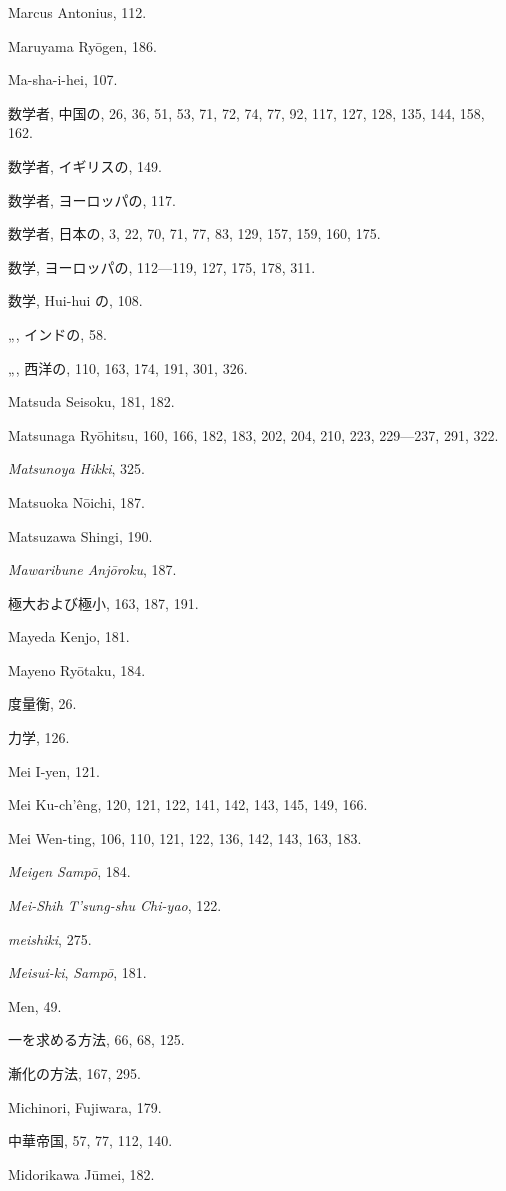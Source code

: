 \documentclass[11pt]{article}
\begin{document}
Marcus Antonius, 112.\par
Maruyama Ryōgen, 186.\par
Ma-sha-i-hei, 107.\par
数学者, 中国の, 26, 36, 51, 53, 71, 72, 74, 77, 92, 117, 127, 128, 135, 144, 158, 162.\par
数学者, イギリスの, 149.\par
数学者, ヨーロッパの, 117.\par
数学者, 日本の, 3, 22, 70, 71, 77, 83, 129, 157, 159, 160, 175.\par
数学, ヨーロッパの, 112—119, 127, 175, 178, 311.\par
数学, Hui-hui の, 108.\par
\quad „\qquad, インドの, 58.\par
\quad „\qquad, 西洋の, 110, 163, 174, 191, 301, 326.\par
Matsuda Seisoku, 181, 182.\par
Matsunaga Ryōhitsu, 160, 166, 182, 183, 202, 204, 210, 223, 229—237, 291, 322.\par
\emph{Matsunoya Hikki}, 325.\par
Matsuoka Nōichi, 187.\par
Matsuzawa Shingi, 190.\par
\emph{Mawaribune Anjōroku}, 187.\par
極大および極小, 163, 187, 191.\par
Mayeda Kenjo, 181.\par
Mayeno Ryōtaku, 184.\par
度量衡, 26.\par
力学, 126.\par
Mei I-yen, 121.\par
Mei Ku-ch'êng, 120, 121, 122, 141, 142, 143, 145, 149, 166.\par
Mei Wen-ting, 106, 110, 121, 122, 136, 142, 143, 163, 183.\par
\emph{Meigen Sampō}, 184.\par
\emph{Mei-Shih T'sung-shu Chi-yao}, 122.\par
\emph{meishiki}, 275.\par
\emph{Meisui-ki}, \emph{Sampō}, 181.\par
Men, 49.\par
一を求める方法, 66, 68, 125.\par
漸化の方法, 167, 295.\par
Michinori, Fujiwara, 179.\par
中華帝国, 57, 77, 112, 140.\par
Midorikawa Jūmei, 182.\par
\end{document}
